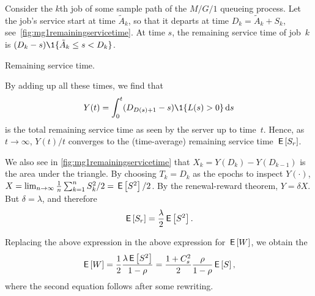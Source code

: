 Consider the $k$th job of some sample path of the $M/G/1$ queueing process.
Let the job's service start at time $\tilde A_k$, so that it departs at time $D_k=\tilde A_k + S_k$, see~\cref{fig:mg1remainingservicetime}.
At time $s$,  the remaining service time of job~$k$ is
$(D_k-s)\1{\tilde A_k \leq s < D_k}$.
\begin{marginfigure}

 \caption{Remaining service time.}
 \label{fig:mg1remainingservicetime}
\end{marginfigure}
By adding up all these times,  we find that
 \begin{equation*}
 Y(t) = \int_0^t (D_{D(s)+1}-s)\1{\L(s) > 0} \d s
 \end{equation*}
 is the total remaining service time as seen by the server up to time~$t$.
 Hence,   as $t \to \infty$, $Y(t)/t$ converges to the  (time-average) remaining service time $\,\mathsf{E}\left[S_r\right]$.

 We also see in \cref{fig:mg1remainingservicetime} that $X_k = Y(D_k) - Y(D_{k-1})$ is the area under the triangle.
 By choosing $T_k=D_k$ as the epochs to inspect $Y(\cdot)$, $X=\lim_{n\to\infty} \frac{1}{n}\sum_{k=1}^n S_k^2/ 2 = \,\mathsf{E}\left[S^2\right]/2$.
 By the renewal-reward theorem, $Y=\delta X$. But $\delta = \lambda$, and therefore
\begin{equation*}
\,\mathsf{E}\left[S_r\right] = \frac{\lambda}2 \,\mathsf{E}\left[S^2\right].
\end{equation*}

Replacing the above expression in the above expression for $\,\mathsf{E}\left[W\right]$, we obtain the 
\begin{equation} \label{eq:710}
 \,\mathsf{E}\left[W\right] = \frac 1 2 \frac{\lambda \,\mathsf{E}\left[S^2\right]}{1-\rho} =\frac{1 + C_s^2}2 \frac{\rho}{1-\rho} \,\mathsf{E}\left[S\right],
\end{equation}
where the second equation follows after some rewriting.


